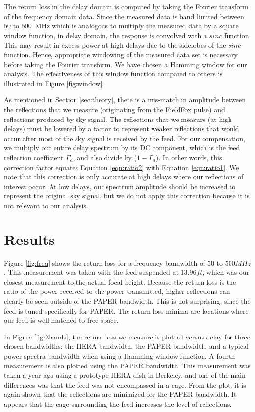 \documentclass[12pt,preprint]{aastex}
\begin{document}
The return loss in the delay domain is computed by taking the Fourier transform
of the frequency domain data. Since the measured data is band limited between 50 to 500~MHz which is analogous to multiply the measured data by a square window function, in delay domain, the response is convolved with a $sinc$ function. This may result in excess power at high
delays due to the sidelobes of the $sinc$ function. Hence, appropriate windowing of the measured data set is necessary before taking the Fourier transform.
We have chosen a Hamming window for our analysis. The effectiveness of this
window function compared to others is illustrated in Figure
\ref{fig:window}. 

As mentioned in Section \ref{sec:theory}, there is a mis-match in amplitude
between the reflections that we measure (originating from the FieldFox pulse)
and reflections produced by sky signal. The reflections that we measure (at high
delays) must be lowered by a factor to represent weaker reflections that would
occur after most of the sky signal is received by the feed. For our
compensation, we multiply our entire delay spectrum by its DC component, which is the feed reflection coefficient $\Gamma_{a}$, and also divide by ($1-\Gamma_{a}$). In other words, this correction factor equates Equation \ref{eqn:ratio2} with Equation \ref{eqn:ratio1}. 
We note that this correction is only accurate at high delays where our
reflections of interest occur. At low delays, our spectrum amplitude should be
increased to represent the original sky signal, but we do not apply this
correction because it is not relevant to our analysis.

\section{Results}
Figure \ref{fig:freq} shows the return loss for a frequency bandwidth of $50$ to
$500MHz$. This measurement was taken with the feed suspended at $13.96ft$, which
was our closest measurement to the actual focal height.  Because the return
loss is the ratio of the power received to the power transmitted, higher
reflections can clearly be seen outside of the PAPER bandwidth. This is not
surprising, since the feed is tuned specifically for PAPER. The return loss
minima are locations where our feed is well-matched to free space.

In Figure \ref{fig:3bands}, the return loss we measure is plotted versus delay for three
chosen bandwidths: the HERA bandwidth, the PAPER bandwidth, and a typical power
spectra bandwidth when using a Hamming window function. A fourth measurement is also plotted using the PAPER bandwidth. This measurement was taken a year ago using a prototype HERA dish in Berkeley, and one of the main differences was that the feed was not encompassed in a cage. From the plot, it is again
shown that the reflections are minimized for the PAPER bandwidth. It appears that the cage surrounding the feed increases the level of reflections.
\end{document}
